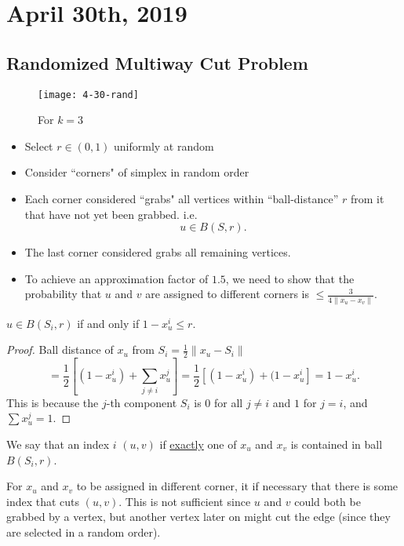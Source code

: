 \documentclass[../main/main.tex]{subfiles}
\begin{document}
\section{April 30th, 2019}
\subsection{Randomized Multiway Cut Problem}
\begin{figure}[h!]
	\centering
	\texttt{[image: 4-30-rand]}
	\caption{For $k=3$}
	\label{fig:4-30-rand}
\end{figure}
\begin{itemize}
	\item Select $r\in (0,1)$ uniformly at random
	\item Consider ``corners" of simplex in random order
	\item Each corner considered ``grabs" all vertices within ``ball-distance''  $r$ from it that have not yet been grabbed. i.e. \[
			u\in B(S,r)
	.\] 
	\item The last corner considered grabs all remaining vertices.
	\item To achieve an approximation factor of $1.5$, we need to show that the probability that $u$ and $v$ are assigned to different corners is $\le \frac{3}{4 \| x_u-x_v\|}$.
\end{itemize}

\begin{lemma}
	$u\in B(S_i,r)$ if and only if $1-x^i_u\le r$.
\end{lemma}
\begin{proof}
	Ball distance of $x_u$ from $S_i = \frac{1}{2}\|x_u-S_i\|$ \[
		=\frac{1}{2}\left[ (1-x_u^i)+ \sum_{j\neq i} x_u^j \right]=\frac{1}{2}\left[ (1-x^i_u)+(1-x^i_u \right] =1-x^i_u
	.\] This is because the $j$-th component $S_i$ is $0$ for all $j\neq i$ and $1$ for $j=i$, and $\sum x^j_u=1$.
\end{proof}

\begin{definition}
	We say that an index $i$  $(u,v)$ if \underline{exactly} one of $x_u$ and $x_v$ is contained in ball $B(S_i,r)$.
\end{definition}

For $x_u$ and $x_v$ to be assigned in different corner, it if necessary that there is some index that cuts  $(u,v)$. This is not sufficient since $u$ and $v$ could both be grabbed by a vertex, but another vertex later on might cut the edge (since they are selected in a random order).\\
\end{document}
